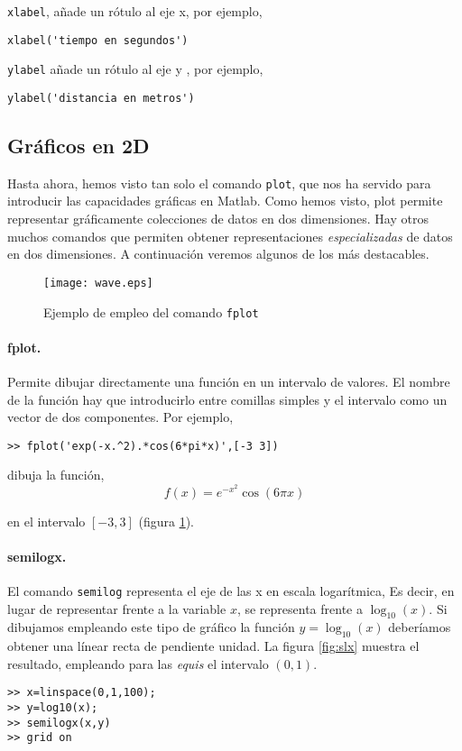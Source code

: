 \texttt{xlabel}, añade un rótulo al eje x, por ejemplo,

\begin{verbatim}
xlabel('tiempo en segundos')
\end{verbatim}

\texttt{ylabel} añade un rótulo al eje y , por ejemplo,
\begin{verbatim}
ylabel('distancia en metros')
\end{verbatim}

\subsection{Gráficos en 2D} 
Hasta ahora, hemos visto tan solo el comando \texttt{plot}, que nos ha servido para introducir las capacidades gráficas en Matlab. Como hemos visto, plot permite representar gráficamente colecciones de datos en dos dimensiones. Hay otros muchos comandos que permiten obtener representaciones \emph{especializadas} de datos en dos dimensiones. A continuación veremos algunos de los más destacables.
\begin{figure}[h]
\centering
\texttt{[image: wave.eps]}
\caption{Ejemplo de empleo del comando \texttt{fplot}}
\label{fig:wave}
\end{figure} 

\paragraph{fplot.} Permite dibujar directamente una función en un intervalo de valores. El nombre de la función hay que introducirlo entre comillas simples y el intervalo como un vector de dos componentes. Por ejemplo,

\begin{verbatim}
>> fplot('exp(-x.^2).*cos(6*pi*x)',[-3 3])
\end{verbatim}

dibuja la función,
\begin{equation*}
f(x)=e^{-x^2}\cos(6\pi x)
\end{equation*}

en el intervalo $[-3,3]$ (figura \ref{fig:wave}).

 
\paragraph{semilogx.} El comando \texttt{semilog} representa el eje de las x en escala logarítmica, Es decir, en lugar de representar frente a la variable $x$, se representa frente a $\log_{10}(x)$. Si dibujamos empleando este tipo de gráfico la función $y=\log_{10}(x)$ deberíamos obtener una línear recta de pendiente unidad. La figura \ref{fig:slx} muestra el resultado, empleando para las \emph{equis} el intervalo $(0,1)$.
\begin{verbatim}
>> x=linspace(0,1,100);
>> y=log10(x);
>> semilogx(x,y)
>> grid on
\end{verbatim}

